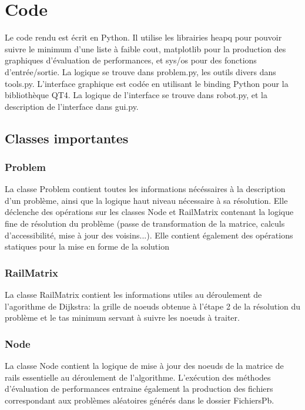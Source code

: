 \documentclass{article}
\begin{document}
\section{Code}
Le code rendu est écrit en Python. Il utilise les librairies heapq pour pouvoir suivre le minimum d'une liste à faible cout, matplotlib pour la production des graphiques d'évaluation de performances, et sys/os pour des fonctions d'entrée/sortie. La logique se trouve dans problem.py, les outils divers dans tools.py.
L'interface graphique est codée en utilisant le binding Python pour la bibliothèque QT4. La logique de l'interface se trouve dans robot.py, et la description de l'interface dans gui.py.
\subsection{Classes importantes}
\subsubsection{Problem}
La classe Problem contient toutes les informations nécéssaires à la description d'un problème, ainsi que la logique haut niveau nécessaire à sa résolution. Elle déclenche des opérations sur les classes Node et RailMatrix contenant la logique fine de résolution du problème (passe de transformation de la matrice, calculs d'accessibilité, mise à jour des voisins...). Elle contient également des opérations statiques pour la mise en forme de la solution
\subsubsection{RailMatrix}
La classe RailMatrix contient les informations utiles au déroulement de l'agorithme de Dijkstra: la grille de noeuds obtenue à l'étape 2 de la résolution du problème et le tas minimum servant à suivre les noeuds à traiter.
\subsubsection{Node}
La classe Node contient la logique de mise à jour des noeuds de la matrice de rails essentielle au déroulement de l'algorithme.
L'exécution des méthodes d'évaluation de performances entraine également la production des fichiers correspondant aux problèmes aléatoires générés dans le dossier FichiersPb.
\end{document}
